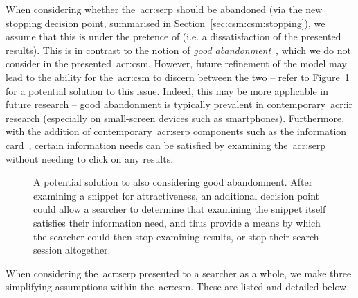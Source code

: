 \noindent
{} When considering whether the~\gls{acr:serp} should be abandoned (via the new stopping decision point, summarised in Section~\ref{sec:csm:csm:stopping}), we assume that this is under the pretence of  (i.e. a dissatisfaction of the presented results). This is in contrast to the notion of \emph{good abandonment}~\citep{khabsa2016good_abandonment}, which we do not consider in the presented~\gls{acr:csm}. However, future refinement of the model may lead to the ability for the~\gls{acr:csm} to discern between the two -- refer to Figure~\ref{fig:csm_bad_good} for a potential solution to this issue. Indeed, this may be more applicable in future research -- good abandonment is typically prevalent in contemporary~\gls{acr:ir} research (especially on small-screen devices such as smartphones). Furthermore, with the addition of contemporary~\gls{acr:serp} components such as the information card~\citep{bota2016information_cards}, certain information needs can be satisfied by examining the~\gls{acr:serp} without needing to click on any results.

\begin{figure}[t!]
    \centering
    \caption[Flowchart considering good abandonment]{A potential solution to also considering good abandonment. After examining a snippet for attractiveness, an additional decision point could allow a searcher to determine that examining the snippet itself satisfies their information need, and thus provide a means by which the searcher could then stop examining results, or stop their search session altogether.}
    \label{fig:csm_bad_good}
\end{figure}

\noindent
{} When considering the~\gls{acr:serp} presented to a searcher as a whole, we make three simplifying assumptions within the~\gls{acr:csm}. These are listed and detailed below.

